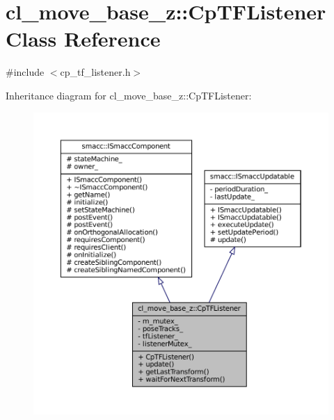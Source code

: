 \hypertarget{classcl__move__base__z_1_1CpTFListener}{}\section{cl\+\_\+move\+\_\+base\+\_\+z\+:\+:Cp\+T\+F\+Listener Class Reference}
\label{classcl__move__base__z_1_1CpTFListener}


{\ttfamily \#include $<$cp\+\_\+tf\+\_\+listener.\+h$>$}



Inheritance diagram for cl\+\_\+move\+\_\+base\+\_\+z\+:\+:Cp\+T\+F\+Listener\+:
\nopagebreak
\begin{figure}[H]
\begin{center}
\leavevmode
\includegraphics[width=350pt]{classcl__move__base__z_1_1CpTFListener__inherit__graph}
\end{center}
\end{figure}



